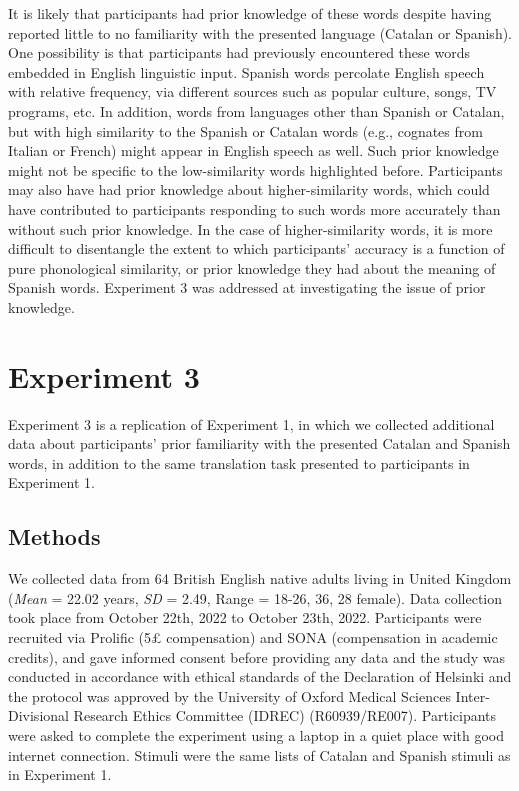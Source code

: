 \documentclass[
  man,
  longtable,
  nolmodern,
  notxfonts,
  notimes,
  colorlinks=true,linkcolor=blue,citecolor=blue,urlcolor=blue]{apa7}
\begin{document}
It is likely that participants had prior knowledge of these words
despite having reported little to no familiarity with the presented
language (Catalan or Spanish). One possibility is that participants had
previously encountered these words embedded in English linguistic input.
Spanish words percolate English speech with relative frequency, via
different sources such as popular culture, songs, TV programs, etc. In
addition, words from languages other than Spanish or Catalan, but with
high similarity to the Spanish or Catalan words (e.g., cognates from
Italian or French) might appear in English speech as well. Such prior
knowledge might not be specific to the low-similarity words highlighted
before. Participants may also have had prior knowledge about
higher-similarity words, which could have contributed to participants
responding to such words more accurately than without such prior
knowledge. In the case of higher-similarity words, it is more difficult
to disentangle the extent to which participants' accuracy is a function
of pure phonological similarity, or prior knowledge they had about the
meaning of Spanish words. Experiment 3 was addressed at investigating
the issue of prior knowledge.

\section{Experiment 3}\label{experiment-3}

Experiment 3 is a replication of Experiment 1, in which we collected
additional data about participants' prior familiarity with the presented
Catalan and Spanish words, in addition to the same translation task
presented to participants in Experiment 1.

\subsection{Methods}\label{methods-2}

We collected data from 64 British English native adults living in United
Kingdom (\emph{Mean} = 22.02 years, \emph{SD} = 2.49, Range = 18-26, 36,
28 female). Data collection took place from October 22th, 2022 to
October 23th, 2022. Participants were recruited via Prolific (5£
compensation) and SONA (compensation in academic credits), and gave
informed consent before providing any data and the study was conducted
in accordance with ethical standards of the Declaration of Helsinki and
the protocol was approved by the University of Oxford Medical Sciences
Inter-Divisional Research Ethics Committee (IDREC) (R60939/RE007).
Participants were asked to complete the experiment using a laptop in a
quiet place with good internet connection. Stimuli were the same lists
of Catalan and Spanish stimuli as in Experiment 1.
\end{document}
